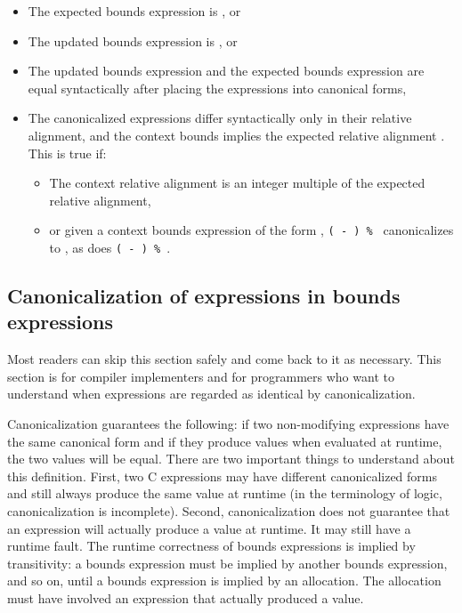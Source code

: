 \begin{itemize}
\item
  The expected bounds expression is \boundsunknown, or
\item
  The updated bounds expression is \boundsany, or
\item
  The updated bounds expression and the expected bounds expression are
  equal syntactically after placing the expressions into canonical
  forms,
\item
  The canonicalized expressions
  differ syntactically only in their relative alignment, and
  the context bounds implies the expected relative alignment .
  This is true if:

  \begin{itemize}
  \item
    The context relative alignment is an integer multiple of the
    expected relative alignment,
  \item
   or given a context bounds expression of the form
   ,
   \texttt{( - ) \% }
   canonicalizes to , as does
   \texttt{( - ) \% }.
  \end{itemize}
\end{itemize}

\subsection{Canonicalization of expressions in bounds expressions}
\label{section:canonicalization}

Most readers can skip this section safely and come back to it as
necessary. This section is for compiler implementers and for programmers
who want to understand when expressions are regarded as identical by
canonicalization.

Canonicalization guarantees the following: if two non-modifying
expressions have the same canonical form and if they produce values when
evaluated at runtime, the two values will be equal. There are two
important things to understand about this definition. First, two C
expressions may have different canonicalized forms and still always
produce the same value at runtime (in the terminology of logic,
canonicalization is incomplete). Second, canonicalization does not
guarantee that an expression will actually produce a value at runtime.
It may still have a runtime fault. The runtime correctness of bounds
expressions is implied by transitivity: a bounds expression must be
implied by another bounds expression, and so on, until a bounds
expression is implied by an allocation. The allocation must have
involved an expression that actually produced a value.

